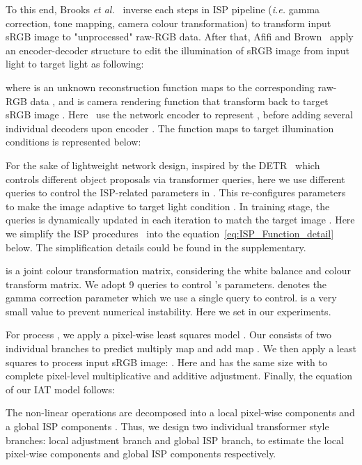 \documentclass{bmvc2k}
\begin{document}
To this end, Brooks \textit{et al.}~\cite{brooks2019unprocessing} inverse each steps in ISP pipeline (\textit{i.e.} gamma correction, tone mapping, camera colour transformation) to transform input sRGB image to "unprocessed" raw-RGB data. After that, Afifi and Brown~\cite{Afifi_2020_CVPR} apply an encoder-decoder structure to edit the illumination of sRGB image from input light  to target light  as following:


where  is an unknown reconstruction function maps  to the corresponding raw-RGB data , and  is camera rendering function that transform  back to target sRGB image . Here~\cite{Afifi_2020_CVPR} use the network encoder  to represent , before adding several individual decoders  upon encoder . The function  maps   to target  illumination conditions is represented below:



 For the sake of lightweight network design, inspired by the DETR~\cite{DETR} which controls different object proposals via transformer queries, here we use different queries to control the ISP-related parameters in .  This re-configures parameters to make the image  adaptive to target light condition . In training stage, the queries is dynamically updated in each iteration to match the target image . 
Here we simplify the ISP procedures~\cite{brooks2019unprocessing,ICCV_MAET,ISP_uprocess_2021_ICCV} into the equation~\ref{eq:ISP_Function_detail} below. The simplification details could be found in the supplementary.





  is a  joint colour transformation matrix, considering the white balance and colour transform matrix. We adopt 9 queries to control 's parameters.  denotes the gamma correction parameter which we use a single query to control.  is a very small value to prevent numerical instability. Here we set  in our experiments.

For process , we apply a pixel-wise least squares model . Our 
consists of two individual branches to predict multiply map  and add map . We then apply a least squares to process input sRGB image: . Here  and  has the same size with  to complete pixel-level multiplicative and additive adjustment. Finally, the equation of our IAT model follows:




The non-linear operations are decomposed into a local pixel-wise components  and a global ISP components . Thus, we design two individual transformer style branches: local adjustment branch and global ISP branch, to estimate the local pixel-wise components and global ISP components respectively. 
\end{document}
